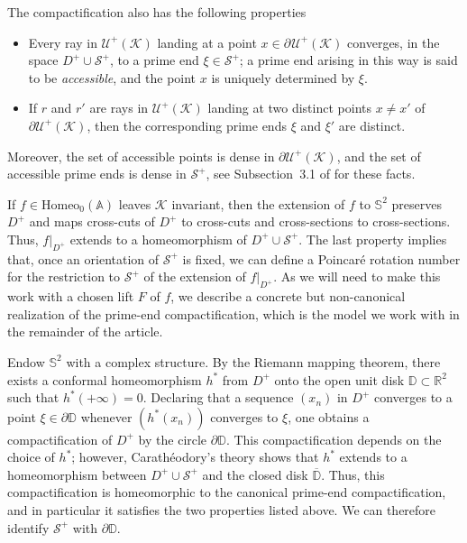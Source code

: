 \documentclass[12pt,a4paper]{amsart}
\theoremstyle{definition}
\theoremstyle{remark}
\newcommand{\D}{\mathbb{D}}
\newcommand{\R}{\mathbb{R}}
\newcommand{\homeo}{\mathrm{Homeo}_0(\A)}
\newcommand{\A}{\mathbb{A}}
\begin{document}
{The compactification also has the following properties
\begin{itemize}
	\item Every ray in $\mathcal{U}^{+}(\mathcal{K})$ landing at a point $x\in\partial\hspace{1pt}\mathcal{U}^{+}(\mathcal{K})$ converges, in the space $D^+\cup\mathcal{S}^+$, to a prime end $\xi\in\mathcal{S}^+$; a prime end arising in this way is said to be \emph{accessible}, and the point $x$ is uniquely determined by $\xi$.
	\item If $r$ and $r'$ are rays in $\mathcal{U}^{+}(\mathcal{K})$ landing at two distinct points $x\neq x'$ of $\partial \mathcal{U}^{+}(\mathcal{K})$, then the corresponding prime ends $\xi$ and $\xi'$ are distinct.
\end{itemize}
Moreover, the set of accessible points is dense in $\partial\mathcal{U}^{+}(\mathcal{K})$, and the set of accessible prime ends is dense in $\mathcal{S}^+$, see Subsection~3.1 of \cite{korolena} for these facts.

If $f\in\homeo$ leaves $\mathcal{K}$ invariant, then the extension of $f$ to $\mathbb{S}^2$ preserves $D^+$ and maps cross-cuts of $D^+$ to cross-cuts and cross-sections to cross-sections. Thus, $f|_{D^+}$ extends to a homeomorphism of $D^+\cup\mathcal{S}^+$. 
The last property implies that, once an orientation of $\mathcal{S}^+$ is fixed, we can define a Poincar\'e rotation number for the restriction to $\mathcal{S}^+$ of the extension of $f|_{D^+}$. As we will need to make this work with a chosen lift $F$ of $f$, we describe a concrete but non-canonical realization of the prime-end compactification, which is the model we work with in the remainder of the article.
 
Endow $\mathbb{S}^2$ with a complex structure. By the Riemann mapping theorem, there exists a conformal homeomorphism $h^*$ from $D^+$ onto the open unit disk $\D\subset\R^2$ such that $h^*(+\infty)=0$. Declaring that a sequence $(x_n)$ in $D^+$ converges to a point $\xi\in\partial\D$ whenever $(h^*(x_n))$ converges to $\xi$, one obtains a compactification of $D^+$ by the circle $\partial\D$. This compactification depends on the choice of $h^*$; however, Carath\'eodory's theory shows that $h^*$ extends to a homeomorphism between $D^+\cup\mathcal{S}^+$ and the closed disk $\overline{\D}$. Thus, this compactification is homeomorphic to the canonical prime-end compactification, and in particular it satisfies the two properties listed above. We can therefore identify $\mathcal{S}^+$ with $\partial\D$.
 
}
\end{document}
